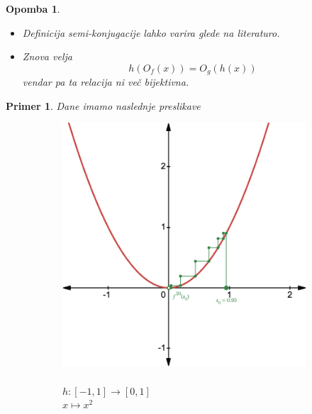 \documentclass{article}
\newtheorem{opomba}{Opomba}
\newtheorem{primer}{Primer}
\begin{document}
\begin{opomba}
\hfill
\begin{itemize}
    \item Definicija semi-konjugacije lahko varira glede na literaturo.
    \item Znova velja 
    $$
    h(O_f(x)) = O_g(h(x))
    $$
    vendar pa ta relacija ni več bijektivna.
\end{itemize}
\end{opomba}

\begin{primer}
Dane imamo naslednje preslikave 
\begin{figure}[h]
    \centering
    \begin{subfigure}[b]{0.32\textwidth}
        \centering
        \includegraphics[width=\textwidth]{Grafi/cobweb131.png}
        \caption{\\$h:[-1, 1] \rightarrow [0, 1] $\\\quad $x \mapsto x^2$}
        \label{fig:cobweb31}
    \end{subfigure}
    \begin{subfigure}[b]{0.32\textwidth}
        \centering

\end{subfigure}
\end{figure}
\end{primer}
\end{document}
